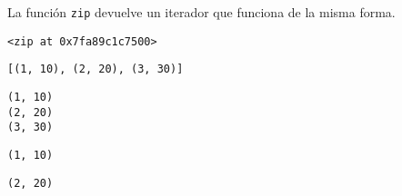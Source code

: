 \begin{code}
La función \texttt{zip} devuelve un iterador que funciona de la misma forma.

\begin{Shaded}
\begin{Highlighting}[]
\OperatorTok{=} \NormalTok{((}\NormalTok{,}\NormalTok{,}\NormalTok{), (}\NormalTok{,}\NormalTok{,}\NormalTok{))}
\end{Highlighting}
\end{Shaded}

\begin{verbatim}
<zip at 0x7fa89c1c7500>
\end{verbatim}

\begin{Shaded}
\begin{Highlighting}[]
\end{Highlighting}
\end{Shaded}

\begin{verbatim}
[(1, 10), (2, 20), (3, 30)]
\end{verbatim}

\begin{Shaded}
\begin{Highlighting}[]
\OperatorTok{=} \NormalTok{((}\NormalTok{,}\NormalTok{,}\NormalTok{), (}\NormalTok{,}\NormalTok{,}\NormalTok{))}

\end{Highlighting}
\end{Shaded}

\begin{verbatim}
(1, 10)
(2, 20)
(3, 30)
\end{verbatim}

\begin{Shaded}
\begin{Highlighting}[]
\OperatorTok{=} \NormalTok{((}\NormalTok{,}\NormalTok{,}\NormalTok{), (}\NormalTok{,}\NormalTok{,}\NormalTok{))}
\end{Highlighting}
\end{Shaded}

\begin{verbatim}
(1, 10)
\end{verbatim}

\begin{Shaded}
\begin{Highlighting}[]
\end{Highlighting}
\end{Shaded}

\begin{verbatim}
(2, 20)
\end{verbatim}
\end{code}  

